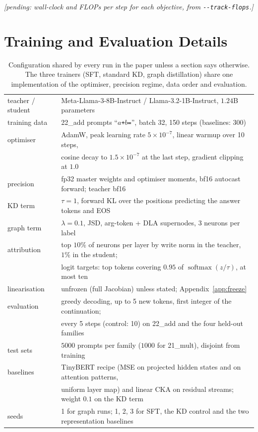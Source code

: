 \documentclass{article}
\newcommand{\pending}[1]{{\color{BurntOrange}\emph{[pending#1]}}}
\DeclareMathOperator{\softmax}{softmax}
\begin{document}
\pending{: wall-clock and FLOPs per step for each objective, from \texttt{-{}-track-flops}.}


\section{Training and Evaluation Details}
\label{app:details}

\begin{table}[h]
  \centering
  \small
  \caption{Configuration shared by every run in the paper unless a section says otherwise. The
  three trainers (SFT, standard KD, graph distillation) share one implementation of the
  optimiser, precision regime, data order and evaluation.}
  \label{tab:config}
  \begin{tabular}{ll}
    \toprule
    teacher / student & Meta-Llama-3-8B-Instruct / Llama-3.2-1B-Instruct, $1.24$B parameters \\
    training data & 22\_add prompts ``\texttt{$a$+$b$=}'', batch 32, 150 steps (baselines: 300) \\
    optimiser & AdamW, peak learning rate $5 \times 10^{-7}$, linear warmup over 10 steps, \\
              & cosine decay to $1.5 \times 10^{-7}$ at the last step, gradient clipping at $1.0$ \\
    precision & fp32 master weights and optimiser moments, bf16 autocast forward; teacher bf16 \\
    KD term & $\tau = 1$, forward KL over the positions predicting the answer tokens and EOS \\
    graph term & $\lambda = 0.1$, JSD, arg-token + DLA supernodes, 3 neurons per label \\
    attribution & top $10\%$ of neurons per layer by write norm in the teacher, $1\%$ in the student; \\
                & logit targets: top tokens covering $0.95$ of $\softmax(z/\tau)$, at most ten \\
    linearisation & unfrozen (full Jacobian) unless stated; Appendix~\ref{app:freeze} \\
    evaluation & greedy decoding, up to 5 new tokens, first integer of the continuation; \\
               & every 5 steps (control: 10) on 22\_add and the four held-out families \\
    test sets & $5000$ prompts per family ($1000$ for 21\_mult), disjoint from training \\
    baselines & TinyBERT recipe (MSE on projected hidden states and on attention patterns, \\
              & uniform layer map) and linear CKA on residual streams; weight $0.1$ on the KD term \\
    seeds & 1 for graph runs; 1, 2, 3 for SFT, the KD control and the two representation baselines \\
    \bottomrule
  \end{tabular}
\end{table}
\end{document}
